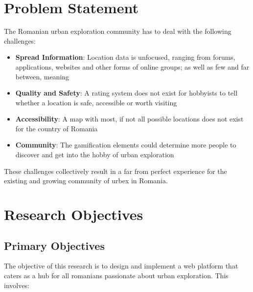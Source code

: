 \documentclass[12pt,a4paper]{report}
\begin{document}
\section*{Problem Statement}

The Romanian urban exploration community has to deal with the following challenges:

\begin{itemize}
    \item \textbf{Spread Information}: Location data is unfocused, ranging from forums, applications, websites and other forms of online groups; as well as few and far between, meaning  
    
    \item \textbf{Quality and Safety}: A rating system does not exist for hobbyists to tell whether a location is safe, accessible or worth visiting
    
    \item \textbf{Accessibility}: A map with most, if not all possible locations does not exist for the country of Romania
    
    \item \textbf{Community}: The gamification elements could determine more people to discover and get into the hobby of urban exploration 
\end{itemize}

These challenges collectively result in a far from perfect experience for the existing and growing community of urbex in Romania.

\section*{Research Objectives}

\subsection*{Primary Objectives}

The objective of this research is to design and implement a web platform that caters as a hub for all romanians passionate about urban exploration. This involves:
\end{document}
